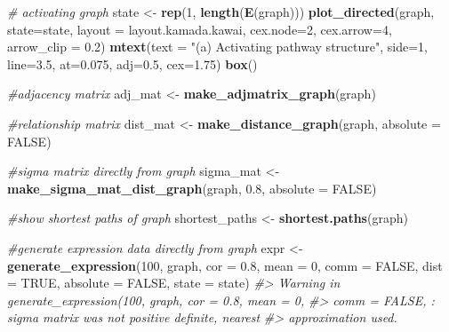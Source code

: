 \documentclass[]{article}
\newenvironment{Shaded}{\begin{snugshade}}{\end{snugshade}}
\newcommand{\CommentTok}[1]{\textcolor[rgb]{0.56,0.35,0.01}{\textit{#1}}}
\newcommand{\DataTypeTok}[1]{\textcolor[rgb]{0.13,0.29,0.53}{#1}}
\newcommand{\DecValTok}[1]{\textcolor[rgb]{0.00,0.00,0.81}{#1}}
\newcommand{\FloatTok}[1]{\textcolor[rgb]{0.00,0.00,0.81}{#1}}
\newcommand{\KeywordTok}[1]{\textcolor[rgb]{0.13,0.29,0.53}{\textbf{#1}}}
\newcommand{\NormalTok}[1]{#1}
\newcommand{\OtherTok}[1]{\textcolor[rgb]{0.56,0.35,0.01}{#1}}
\newcommand{\StringTok}[1]{\textcolor[rgb]{0.31,0.60,0.02}{#1}}
\begin{document}
\begin{Shaded}
\begin{Highlighting}[]
\CommentTok{# activating graph}
\NormalTok{state <-}\StringTok{ }\KeywordTok{rep}\NormalTok{(}\DecValTok{1}\NormalTok{, }\KeywordTok{length}\NormalTok{(}\KeywordTok{E}\NormalTok{(graph)))}
\KeywordTok{plot_directed}\NormalTok{(graph, }\DataTypeTok{state=}\NormalTok{state, }\DataTypeTok{layout =}\NormalTok{ layout.kamada.kawai,}
              \DataTypeTok{cex.node=}\DecValTok{2}\NormalTok{, }\DataTypeTok{cex.arrow=}\DecValTok{4}\NormalTok{, }\DataTypeTok{arrow_clip =} \FloatTok{0.2}\NormalTok{)}
\KeywordTok{mtext}\NormalTok{(}\DataTypeTok{text =} \StringTok{"(a) Activating pathway structure"}\NormalTok{, }\DataTypeTok{side=}\DecValTok{1}\NormalTok{, }\DataTypeTok{line=}\FloatTok{3.5}\NormalTok{, }\DataTypeTok{at=}\FloatTok{0.075}\NormalTok{, }\DataTypeTok{adj=}\FloatTok{0.5}\NormalTok{, }\DataTypeTok{cex=}\FloatTok{1.75}\NormalTok{)}
\KeywordTok{box}\NormalTok{()}

\CommentTok{#adjacency matrix}
\NormalTok{adj_mat <-}\StringTok{ }\KeywordTok{make_adjmatrix_graph}\NormalTok{(graph)}

\CommentTok{#relationship matrix}
\NormalTok{dist_mat <-}\StringTok{ }\KeywordTok{make_distance_graph}\NormalTok{(graph, }\DataTypeTok{absolute =} \OtherTok{FALSE}\NormalTok{)}

\CommentTok{#sigma matrix directly from graph}
\NormalTok{sigma_mat <-}\StringTok{ }\KeywordTok{make_sigma_mat_dist_graph}\NormalTok{(graph, }\FloatTok{0.8}\NormalTok{, }\DataTypeTok{absolute =} \OtherTok{FALSE}\NormalTok{)}

\CommentTok{#show shortest paths of graph}
\NormalTok{shortest_paths <-}\StringTok{ }\KeywordTok{shortest.paths}\NormalTok{(graph)}

\CommentTok{#generate expression data directly from graph}
\NormalTok{expr <-}\StringTok{ }\KeywordTok{generate_expression}\NormalTok{(}\DecValTok{100}\NormalTok{, graph, }\DataTypeTok{cor =} \FloatTok{0.8}\NormalTok{, }\DataTypeTok{mean =} \DecValTok{0}\NormalTok{, }\DataTypeTok{comm =} \OtherTok{FALSE}\NormalTok{,}
                            \DataTypeTok{dist =} \OtherTok{TRUE}\NormalTok{, }\DataTypeTok{absolute =} \OtherTok{FALSE}\NormalTok{, }\DataTypeTok{state =}\NormalTok{ state)}
\CommentTok{#> Warning in generate_expression(100, graph, cor = 0.8, mean = 0,}
\CommentTok{#> comm = FALSE, : sigma matrix was not positive definite, nearest}
\CommentTok{#> approximation used.}


\end{Highlighting}
\end{Shaded}
\end{document}
